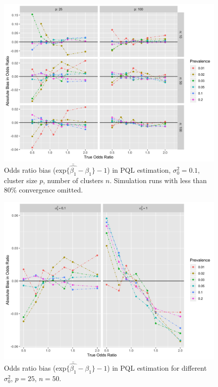 \documentclass{article}
\begin{document}
\begin{flushleft}
\begin{figure}[]
\begin{center}
\includegraphics[width=\textwidth]{_bias_pql_sbspt1.png}
  \caption{Odds ratio bias ($\text{exp} \{ \bar{\hat{\beta_1}} - \beta_1 \} - 1$) in PQL estimation, $\sigma^2_0=0.1$, cluster size $p$, number of clusters $n$. Simulation runs with less than 80\% convergence omitted.}
    \label{fig:_bias_pql_sbs_pt1}
\end{center}
\end{figure}

\begin{figure}[]
\begin{center}
\includegraphics[width=\textwidth]{_bias_pql_sbs_p25_n50.png}
  \caption{Odds ratio bias ($\text{exp} \{ \bar{\hat{\beta_1}} - \beta_1 \}-1$) in PQL estimation for different $\sigma^2_0$, $p=25$, $n=50$.}
    \label{fig:_bias_pql_sbs_single_comparison}
\end{center}
\end{figure}


\end{flushleft}
\end{document}
